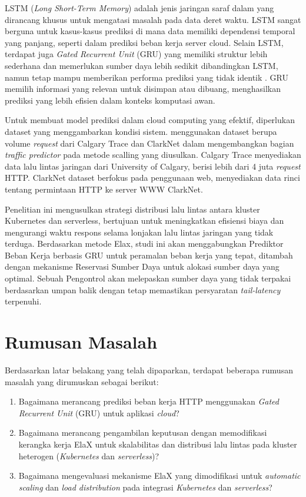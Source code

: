 LSTM (\emph{Long Short-Term Memory}) adalah jenis jaringan saraf dalam yang dirancang khusus untuk mengatasi masalah pada data deret waktu. LSTM sangat berguna untuk kasus-kasus prediksi di mana data memiliki dependensi temporal yang panjang, seperti dalam prediksi beban kerja server cloud. Selain LSTM, terdapat juga \emph{Gated Recurrent Unit} (GRU) yang memiliki struktur lebih sederhana dan memerlukan sumber daya lebih sedikit dibandingkan LSTM, namun tetap mampu memberikan performa prediksi yang tidak identik \citep{mondal2023toward}. GRU memilih informasi yang relevan untuk disimpan atau dibuang, menghasilkan prediksi yang lebih efisien dalam konteks komputasi awan.

Untuk membuat model prediksi dalam cloud computing yang efektif, diperlukan dataset yang menggambarkan kondisi sistem. \citet{yang2019elax} menggunakan dataset berupa volume \emph{request} dari Calgary Trace dan ClarkNet dalam mengembangkan bagian \emph{traffic predictor} pada metode scalling yang diusulkan. Calgary Trace menyediakan data lalu lintas jaringan dari University of Calgary, berisi lebih dari 4 juta \emph{request} HTTP. ClarkNet dataset berfokus pada penggunaan web, menyediakan data rinci tentang permintaan HTTP ke server WWW ClarkNet.

Penelitian ini mengusulkan strategi distribusi lalu lintas antara kluster Kubernetes dan serverless, bertujuan untuk meningkatkan efisiensi biaya dan mengurangi waktu respons selama lonjakan lalu lintas jaringan yang tidak terduga. Berdasarkan metode Elax, studi ini akan menggabungkan Prediktor Beban Kerja berbasis GRU untuk peramalan beban kerja yang tepat, ditambah dengan mekanisme Reservasi Sumber Daya untuk alokasi sumber daya yang optimal. Sebuah Pengontrol akan melepaskan sumber daya yang tidak terpakai berdasarkan umpan balik dengan tetap memastikan persyaratan \emph{tail-latency} terpenuhi.

\section{Rumusan Masalah}
\label{sec:rumusan-masalah}

Berdasarkan latar belakang yang telah dipaparkan, terdapat beberapa rumusan masalah yang dirumuskan sebagai berikut:

\begin{enumerate}
    \item Bagaimana merancang prediksi beban kerja HTTP menggunakan \emph{Gated Recurrent Unit} (GRU) untuk aplikasi \emph{cloud}?
    \item Bagaimana merancang pengambilan keputusan dengan memodifikasi kerangka kerja ElaX untuk skalabilitas dan distribusi lalu lintas pada kluster heterogen (\emph{Kubernetes} dan \emph{serverless})?
    \item Bagaimana mengevaluasi mekanisme ElaX yang dimodifikasi untuk \emph{automatic scaling} dan \emph{load distribution} pada integrasi \emph{Kubernetes} dan \emph{serverless}?
\end{enumerate}

